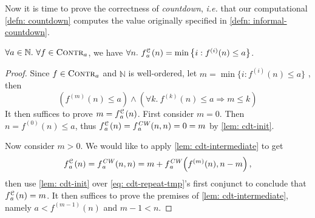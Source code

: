 Now it is time to prove the correctness of \emph{countdown}, \emph{i.e.} that our computational \cref{defn: countdown} computes the value originally specified in \cref{defn: informal-countdown}.
\begin{thm} \label{thm: cdt-repeat}
	$\forall a \in \mathbb{N}.~ \forall f\in \text{\scshape{Contr}}_{a}$, we have 
$	\forall n.~ \cdt{f}{a}(n) = \min\left\{ i : f^{(i)}(n) \le a \right\} $.
\end{thm}
\begin{proof}
Since $f\in \text{\scshape{Contr}}_{a}$ and $\mathbb{N}$ is well-ordered, let $m = \min\big\{i : f^{(i)}(n)\le a\big\}$ , then
	\begin{equation}
	\left(f^{(m)}(n) \le a\right) \label{eq: cdt-repeat-tmp} \wedge
	 \left(\forall k.~f^{(k)}(n)\le a \Rightarrow m \le k\right)
	\end{equation}
	It then suffices to prove $m = \cdt{f}{a}(n)$. First consider $m = 0$. Then $n = f^{(0)}(n)\le a$, thus $\cdt{f}{a}(n) = \cdw{f}{a}(n, n) = 0 = m$ by \cref{lem: cdt-init}.
	
	Now consider $m > 0$. We would like to apply \cref{lem: cdt-intermediate} to get
	\begin{equation*}
	\cdt{f}{a}(n) = \cdw{f}{a}(n, n) = m + \cdw{f}{a}\left(f^{(m)}(n), n-m\right),
	\end{equation*}
	then use \cref{lem: cdt-init} over \eqref{eq: cdt-repeat-tmp}'s first conjunct to conclude that $\cdt{f}{a}(n) = m$. It then suffices to prove the premises of \cref{lem: cdt-intermediate}, namely $a < f^{(m-1)}(n)$ and $m-1 < n$.
	

\end{proof}
